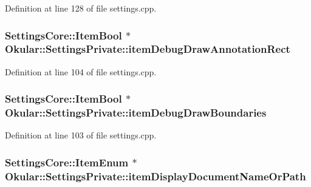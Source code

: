 Definition at line 128 of file settings.\+cpp.

\hypertarget{classOkular_1_1SettingsPrivate_aa2ab33eec8e6aaf70a5d5af48f242f01}{
\subsubsection[{item\+Debug\+Draw\+Annotation\+Rect}]{\setlength{\rightskip}{0pt plus 5cm}Settings\+Core\+::\+Item\+Bool $\ast$ Okular\+::\+Settings\+Private\+::item\+Debug\+Draw\+Annotation\+Rect}}\label{classOkular_1_1SettingsPrivate_aa2ab33eec8e6aaf70a5d5af48f242f01}


Definition at line 104 of file settings.\+cpp.

\hypertarget{classOkular_1_1SettingsPrivate_a17c1efc22296d9ca79cb5e2b90beb840}{
\subsubsection[{item\+Debug\+Draw\+Boundaries}]{\setlength{\rightskip}{0pt plus 5cm}Settings\+Core\+::\+Item\+Bool $\ast$ Okular\+::\+Settings\+Private\+::item\+Debug\+Draw\+Boundaries}}\label{classOkular_1_1SettingsPrivate_a17c1efc22296d9ca79cb5e2b90beb840}


Definition at line 103 of file settings.\+cpp.

\hypertarget{classOkular_1_1SettingsPrivate_a4010969bd67d27abbe14bad23b7ed77f}{
\subsubsection[{item\+Display\+Document\+Name\+Or\+Path}]{\setlength{\rightskip}{0pt plus 5cm}Settings\+Core\+::\+Item\+Enum $\ast$ Okular\+::\+Settings\+Private\+::item\+Display\+Document\+Name\+Or\+Path}}\label{classOkular_1_1SettingsPrivate_a4010969bd67d27abbe14bad23b7ed77f}


